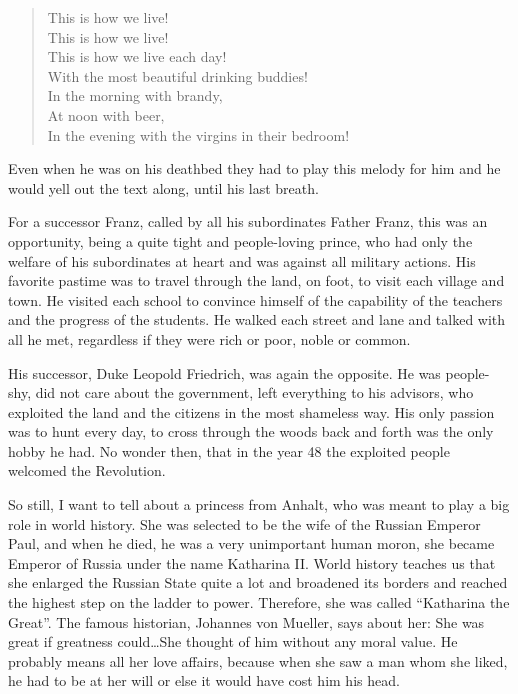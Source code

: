 \begin{quote}
This is how we live!\\
This is how we live!\\
This is how we live each day!\\
With the most beautiful drinking buddies!\\
In the morning with brandy,\\
At noon with beer,\\
In the evening with the virgins in their bedroom!
\end{quote}

Even when he was on his deathbed they had to play this melody for him and he would yell out the text along, until his last breath.

For a successor Franz, called by all his subordinates Father Franz, this was an opportunity, being a quite tight and people-loving prince, who had only the welfare of his subordinates at heart and was against all military actions. His favorite pastime was to travel through the land, on foot, to visit each village and town. He visited each school to convince himself of the capability of the teachers and the progress of the students. He walked each street and lane and talked with all he met, regardless if they were rich or poor, noble or common.

His successor, Duke Leopold Friedrich, was again the opposite. He was people-shy, did not care about the government, left everything to his advisors, who exploited the land and the citizens in the most shameless way. His only passion was to hunt every day, to cross through the woods back and forth was the only hobby he had. No wonder then, that in the year 48 the exploited people welcomed the Revolution.

So still, I want to tell about a princess from Anhalt, who was meant to play a big role in world history. She was selected to be the wife of the Russian Emperor Paul, and when he died, he was a very unimportant human moron, she became Emperor of Russia under the name Katharina II. World history teaches us that she enlarged the Russian State quite a lot and broadened its borders and reached the highest step on the ladder to power. Therefore, she was called ``Katharina the Great''. The famous historian, Johannes von Mueller, says about her: She was great if greatness could\ldots She thought of him without any moral value. He probably means all her love affairs, because when she saw a man whom she liked, he had to be at her will or else it would have cost him his head.

